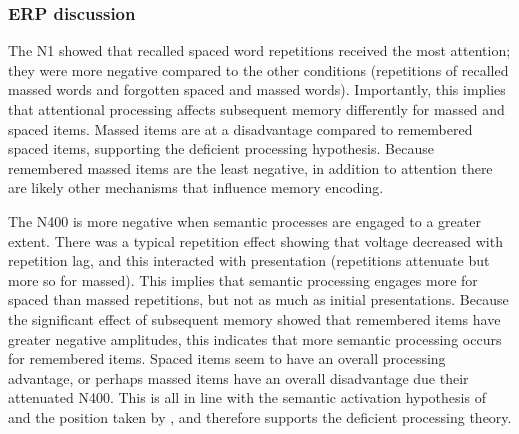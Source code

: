 
\subsubsection{ERP discussion}

The N1 showed that recalled spaced word repetitions received the most attention; they were more negative compared to the other conditions (repetitions of recalled massed words and forgotten spaced and massed words).
Importantly, this implies that attentional processing affects subsequent memory differently for massed and spaced items.
Massed items are at a disadvantage compared to remembered spaced items, supporting the deficient processing hypothesis.  Because remembered massed items are the least negative, in addition to attention there are likely other mechanisms that influence memory encoding.


The N400 is more negative when semantic processes are engaged to a greater extent.  There was a typical repetition effect showing that voltage decreased with repetition lag, and this interacted with presentation (repetitions attenuate but more so for massed).  This implies that semantic processing engages more for spaced than massed repetitions, but not as much as initial presentations.
Because the significant effect of subsequent memory showed that remembered items have greater negative amplitudes, this indicates that more semantic processing occurs for remembered items.  Spaced items seem to have an overall processing advantage, or perhaps massed items have an overall disadvantage due their attenuated N400.  This is all in line with the semantic activation hypothesis of  and the position taken by , and therefore supports the deficient processing theory.

